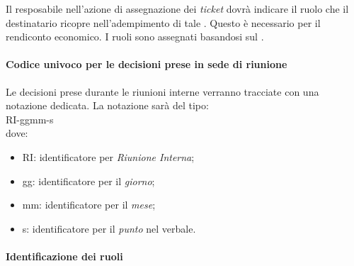 Il resposabile nell'azione di assegnazione dei \textit{ticket} dovr\`a indicare il ruolo che il destinatario ricopre nell'adempimento di tale . Questo \`e necessario per il rendiconto economico. I ruoli sono assegnati basandosi sul \PianoDiProgetto.



\paragraph*{Codice univoco per le decisioni prese in sede di riunione}
Le decisioni prese durante le riunioni interne verranno tracciate con una notazione dedicata.
La notazione sar\`a del tipo: \\
RI-ggmm-s \\
dove:
\begin{itemize}
\item RI: identificatore per \textit{Riunione Interna};
\item gg: identificatore per il \textit{giorno};
\item mm: identificatore per il \textit{mese};
\item s: identificatore per il \textit{punto} nel verbale.
\end{itemize}



\paragraph*{Identificazione dei ruoli}

